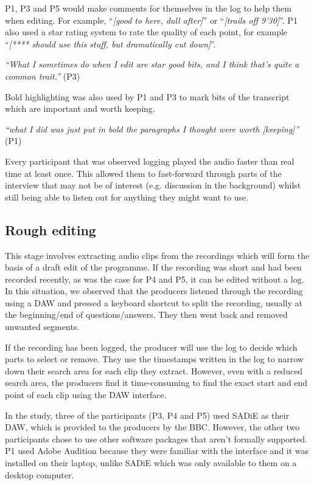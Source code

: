 P1, P3 and P5 would make comments for themselves in the log to help them when
editing. For example, ``\textit{[good to here, dull after]}'' or
``\textit{[trails off 9'30]}''. P1 also used a star rating system to rate the
quality of each point, for example ``\textit{[**** should use this stuff, but
  dramatically cut down]}''.

\textit{``What I sometimes do when I edit are star good bits, and I think
  that's quite a common trait.''} (P3)

Bold highlighting was also used by P1 and P3 to mark bits of the transcript
which are important and worth keeping.

\textit{``what I did was just put in bold the paragraphs I thought were worth
  [keeping]''} (P1)

Every participant that was observed logging played the audio faster than real
time at least once. This allowed them to fast-forward through parts of the
interview that may not be of interest (e.g. discussion in the background)
whilst still being able to listen out for anything they might want to use.

\subsection{Rough editing}
This stage involves extracting audio clips from the recordings which will form
the basis of a draft edit of the programme. If the recording was short and had
been recorded recently, as was the case for P4 and P5, it can be edited without
a log. In this situation, we observed that the producers listened through the
recording using a DAW and pressed a keyboard shortcut to split the recording,
usually at the beginning/end of questions/answers. They then went back and
removed unwanted segments.

If the recording has been logged, the producer will use the log to decide which
parts to select or remove. They use the timestamps written in the log to narrow
down their search area for each clip they extract. However, even with a reduced
search area, the producers find it time-consuming to find the exact start and
end point of each clip using the DAW interface.

In the study, three of the participants (P3, P4 and P5) used SADiE as their
DAW, which is provided to the producers by the BBC. However, the other two
participants chose to use other software packages that aren't formally
supported. P1 used Adobe Audition because they were familiar with the interface
and it was installed on their laptop, unlike SADiE which was only available to
them on a desktop computer.

